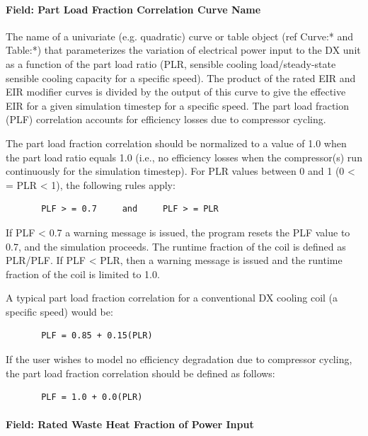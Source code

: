 \paragraph{Field: Part Load Fraction Correlation Curve Name}\label{field-part-load-fraction-correlation-curve-name}

The name of a univariate (e.g. quadratic) curve or table object (ref Curve:* and Table:*) that parameterizes the variation of electrical power input to the DX unit as a function of the part load ratio (PLR, sensible cooling load/steady-state sensible cooling capacity for a specific speed). The product of the rated EIR and EIR modifier curves is divided by the output of this curve to give the effective EIR for a given simulation timestep for a specific speed. The part load fraction (PLF) correlation accounts for efficiency losses due to compressor cycling.

The part load fraction correlation should be normalized to a value of 1.0 when the part load ratio equals 1.0 (i.e., no efficiency losses when the compressor(s) run continuously for the simulation timestep). For PLR values between 0 and 1 (0 \textless{} = PLR \textless{} 1), the following rules apply:

\begin{lstlisting}
       PLF > = 0.7     and     PLF > = PLR
\end{lstlisting}

If PLF \textless{} 0.7 a warning message is issued, the program resets the PLF value to 0.7, and the simulation proceeds. The runtime fraction of the coil is defined as PLR/PLF. If PLF \textless{} PLR, then a warning message is issued and the runtime fraction of the coil is limited to 1.0.

A typical part load fraction correlation for a conventional DX cooling coil (a specific speed) would be:

\begin{lstlisting}
       PLF = 0.85 + 0.15(PLR)
\end{lstlisting}

If the user wishes to model no efficiency degradation due to compressor cycling, the part load fraction correlation should be defined as follows:

\begin{lstlisting}
       PLF = 1.0 + 0.0(PLR)
\end{lstlisting}

\paragraph{Field: Rated Waste Heat Fraction of Power Input}\label{field-rated-waste-heat-fraction-of-power-input}

